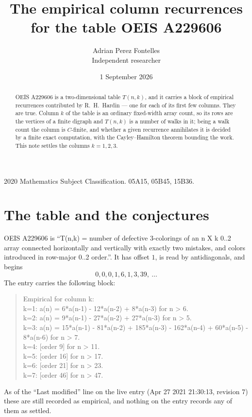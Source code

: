 \documentclass[11pt,a4paper]{article}
\title{The empirical column recurrences for the table OEIS A229606}
\author{Adrian Perez Fontelles\\ \small Independent researcher}
\date{1 September 2026}
\theoremstyle{plain}
\theoremstyle{definition}
\begin{document}
\maketitle

\begin{abstract}
OEIS A229606 is a two-dimensional table $T(n,k)$, and it carries a block of empirical
recurrences contributed by R.~H.~Hardin --- one for each of its first few columns. They are
true. Column $k$ of the table is an ordinary fixed-width array count, so its rows are the
vertices of a finite digraph and $T(n,k)$ is a number of walks in it; being a walk count the
column is $C$-finite, and whether a given recurrence annihilates it is decided by a finite
exact computation, with the Cayley--Hamilton theorem bounding the work. This note settles the columns $k=1, 2, 3$.
\end{abstract}

\noindent\small 2020 Mathematics Subject Classification. 05A15, 05B45, 15B36.\normalsize

\section{The table and the conjectures}

OEIS A229606 is ``T(n,k) = number of defective 3-colorings of an n X k 0..2 array connected horizontally and vertically with exactly two mistakes, and colors introduced in row-major 0..2 order.''. It has offset $1$, is
read by antidiagonals, and begins
\[
0, 0, 0, 1, 6, 1, 3, 39,\ \dots
\]
The entry carries the following block:
\begin{quote}\small
Empirical for column k:\\
k=1: a(n) = 6*a(n-1) - 12*a(n-2) + 8*a(n-3) for n > 6.\\
k=2: a(n) = 9*a(n-1) - 27*a(n-2) + 27*a(n-3) for n > 5.\\
k=3: a(n) = 15*a(n-1) - 81*a(n-2) + 185*a(n-3) - 162*a(n-4) + 60*a(n-5) - 8*a(n-6) for n > 7.\\
k=4: [order 9] for n > 11.\\
k=5: [order 16] for n > 17.\\
k=6: [order 21] for n > 23.\\
k=7: [order 46] for n > 47.\\
\end{quote}
As of the ``Last modified'' line on the live entry (Apr 27 2021 21:30:13, revision 7) these are still
recorded as empirical, and nothing on the entry records any of them as settled.
\end{document}

